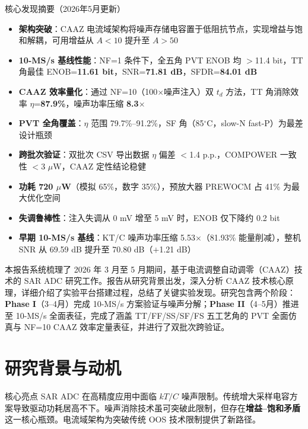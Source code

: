 \documentclass[11pt,a4paper,UTF8]{ctexart}
\begin{document}
\begin{findbox}{核心发现摘要（2026年5月更新）}
\begin{itemize}
  \item \textbf{架构突破}：CAAZ 电流域架构将噪声存储电容置于低阻抗节点，实现增益与饱和解耦，可用增益从 $A<10$ 提升至 $A>50$
  \item \textbf{10-MS/s 基线性能}：NF=1 条件下，全五角 PVT ENOB 均 $>$11.4 bit，TT 角最佳 ENOB=\textbf{11.61 bit}，SNR=\textbf{71.81 dB}，SFDR=\textbf{84.01 dB}
  \item \textbf{CAAZ 效率量化}：通过 NF=10（100$\times$噪声注入）双 $t_d$ 方法，TT 角消除效率 $\eta$=\textbf{87.9\%}，噪声功率压缩 \textbf{8.3$\times$}
  \item \textbf{PVT 全角覆盖}：$\eta$ 范围 79.7\%--91.2\%，SF 角（85$^\circ$C，slow-N fast-P）为最差设计瓶颈
  \item \textbf{跨批次验证}：双批次 CSV 导出数据 $\eta$ 偏差 $<$1.4 p.p.，COMPOWER 一致性 $<$3 $\mu$W，CAAZ 定性结论稳健
  \item \textbf{功耗 720 $\mu$W}（模拟 65\%，数字 35\%），预放大器 PREWOCM 占 41\% 为最大优化空间
  \item \textbf{失调鲁棒性}：注入失调从 0 mV 增至 5 mV 时，ENOB 仅下降约 0.2 bit
  \item \textbf{早期 10-MS/s 基线}：KT/C 噪声功率压缩 5.53$\times$（81.93\% 能量削减），整机 SNR 从 69.59 dB 提升至 70.80 dB（$+$1.21 dB）
\end{itemize}
\end{findbox}

本报告系统梳理了 2026 年 3 月至 5 月期间，基于电流调整自动调零（CAAZ）技术的 SAR ADC 研究工作。报告从研究背景出发，深入分析 CAAZ 技术核心原理，详细介绍了实验平台搭建过程，总结了关键实验发现。研究包含两个阶段：\textbf{Phase I}（3--4月）完成 10-MS/s 方案验证与噪声分解；\textbf{Phase II}（4--5月）推进至 10-MS/s 全面表征，完成了涵盖 TT/FF/SS/SF/FS 五工艺角的 PVT 全面仿真与 NF=10 CAAZ 效率定量表征，并进行了双批次跨验证。

\section{研究背景与动机}
\label{sec:background}

\begin{findbox}{核心亮点}
SAR ADC 在高精度应用中面临 $kT/C$ 噪声限制。传统增大采样电容方案导致驱动功耗居高不下。噪声消除技术虽可突破此限制，但存在\textbf{增益--饱和矛盾}这一核心瓶颈。电流域架构为突破传统 OOS 技术限制提供了新路径。
\end{findbox}
\end{document}

